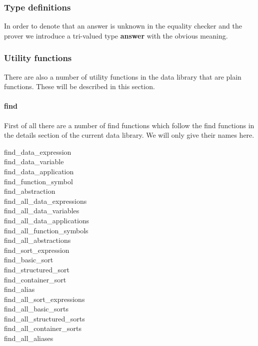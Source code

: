\documentclass[a4paper,11pt]{article}
\begin{document}
\subsubsection{Type definitions}
In order to denote that an answer is unknown in the equality checker and the prover we introduce a tri-valued type \textbf{answer} with the obvious meaning.

\subsubsection{Utility functions}
There are also a number of utility functions in the data library that are plain functions. These will be described in this section.

\paragraph{find}
First of all there are a number of find functions which follow the find functions in the details section of the current data library. We will only give their names here.

\begin{description}
  \item[find\_data\_expression]
  \item[find\_data\_variable]
  \item[find\_data\_application]
  \item[find\_function\_symbol]
  \item[find\_abstraction]
  \item[find\_all\_data\_expressions]
  \item[find\_all\_data\_variables]
  \item[find\_all\_data\_applications]
  \item[find\_all\_function\_symbols]
  \item[find\_all\_abstractions]
  \item[find\_sort\_expression]
  \item[find\_basic\_sort]
  \item[find\_structured\_sort]
  \item[find\_container\_sort]
  \item[find\_alias]
  \item[find\_all\_sort\_expressions]
  \item[find\_all\_basic\_sorts]
  \item[find\_all\_structured\_sorts]
  \item[find\_all\_container\_sorts]
  \item[find\_all\_aliases]
\end{description}
\end{document}

